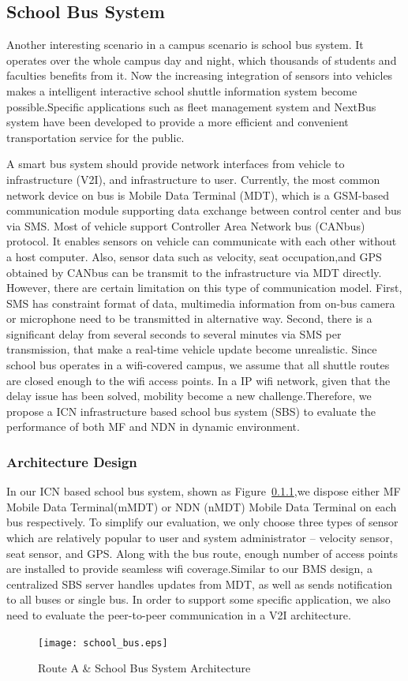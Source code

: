 \subsection{School Bus System}
Another interesting scenario in a campus scenario is school bus system. It operates over the whole campus day and night, which thousands of students and faculties benefits from it. Now the increasing integration of sensors into vehicles makes a intelligent interactive school shuttle information system become possible.Specific applications such as fleet management system and NextBus system have been developed to provide a more efficient and convenient transportation service for the public. 

A smart bus system should provide network interfaces from vehicle  to infrastructure (V2I), and infrastructure to user.  Currently, the most common network device on bus is Mobile Data Terminal (MDT), which is a GSM-based communication module supporting data exchange between control center and bus via SMS. Most of vehicle support Controller Area Network bus (CANbus) protocol\cite{}. It enables sensors on vehicle can communicate with each other without a host computer. Also, sensor data such as velocity, seat occupation,and GPS obtained by CANbus can be transmit to the infrastructure via MDT directly. However, there are certain limitation on this type of communication model. First, SMS has constraint format of data, multimedia information from on-bus camera or microphone need to be transmitted in alternative way. Second, there is a significant delay from several seconds to several minutes via SMS per transmission, that make a real-time vehicle update become unrealistic. Since school bus operates in a wifi-covered campus, we assume that all shuttle routes are closed enough to the wifi access points. In a IP wifi network, given that the delay issue has been solved, mobility become a new challenge.Therefore, we propose a ICN infrastructure based school bus system (SBS) to evaluate the performance of both MF and NDN in dynamic environment.
\subsubsection{Architecture Design}
In our ICN based school bus system,  shown as Figure~\ref{},we dispose either MF Mobile Data Terminal(mMDT) or NDN (nMDT) Mobile Data Terminal on each bus respectively. To simplify our evaluation, we only choose three types of sensor which are relatively popular to user and system administrator -- velocity sensor, seat sensor, and GPS. Along with the bus route, enough number of access points are installed to provide seamless wifi coverage.Similar to our BMS design, a centralized SBS server handles updates from MDT, as well as sends notification to all buses or single bus. In order to support some specific application, we also need to evaluate the peer-to-peer communication in a V2I architecture. 
\begin{figure}
\texttt{[image: school\_bus.eps]}
\caption{Route A \& School Bus System Architecture}
\label{fig:bus}
\end{figure}
